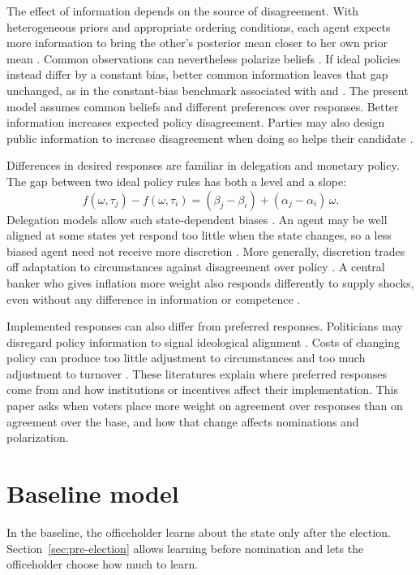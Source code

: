 \documentclass[12pt,letterpaper]{article}
\begin{document}
The effect of information depends on the source of disagreement. With heterogeneous priors and appropriate ordering conditions, each agent expects more information to bring the other's posterior mean closer to her own prior mean \citep{KartikLeeSuen2021}. Common observations can nevertheless polarize beliefs \citep{DixitWeibull2007}. If ideal policies instead differ by a constant bias, better common information leaves that gap unchanged, as in the constant-bias benchmark associated with \citet{CrawfordSobel1982} and \citet{KVW2017}. The present model assumes common beliefs and different preferences over responses. Better information increases expected policy disagreement. Parties may also design public information to increase disagreement when doing so helps their candidate \citep{AlonsoCamara2016}.

Differences in desired responses are familiar in delegation and monetary policy. The gap between two ideal policy rules has both a level and a slope:
\[
f(\omega,\tau_j)-f(\omega,\tau_i)=(\beta_j-\beta_i)+(\alpha_j-\alpha_i)\,\omega.
\]
Delegation models allow such state-dependent biases \citep{MelumadShibano1991,AlonsoMatouschek2008}. An agent may be well aligned at some states yet respond too little when the state changes, so a less biased agent need not receive more discretion \citep{AlonsoMatouschek2008}. More generally, discretion trades off adaptation to circumstances against disagreement over policy \citep{AmadorBagwell2013}. A central banker who gives inflation more weight also responds differently to supply shocks, even without any difference in information or competence \citep{Rogoff1985}.

Implemented responses can also differ from preferred responses. Politicians may disregard policy information to signal ideological alignment \citep{CanesWroneShotts2007}. Costs of changing policy can produce too little adjustment to circumstances and too much adjustment to turnover \citep{LoeperDziuda2024}. These literatures explain where preferred responses come from and how institutions or incentives affect their implementation. This paper asks when voters place more weight on agreement over responses than on agreement over the base, and how that change affects nominations and polarization.

\section{Baseline model}\label{sec:model}

In the baseline, the officeholder learns about the state only after the election. Section~\ref{sec:pre-election} allows learning before nomination and lets the officeholder choose how much to learn.
\end{document}
